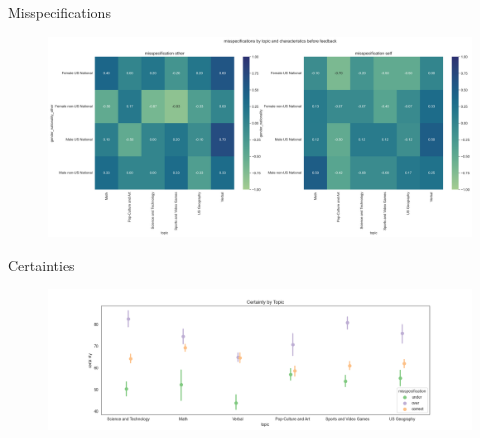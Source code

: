 \documentclass[aspectratio=169]{beamer}
\begin{document}
\begin{frame}{Misspecifications}
    \label{misspecificationsheat}
    \begin{figure}
        \centering
        \includegraphics[scale=.3]{misspecifications_characteristics_treatment.png}
    \end{figure}
\end{frame}

\begin{frame}{Certainties}
    \label{certainties}
    \begin{figure}
        \centering
        \includegraphics[scale=.4]{certainty_by_topic.png}
    \end{figure}

\end{frame}
\end{document}

